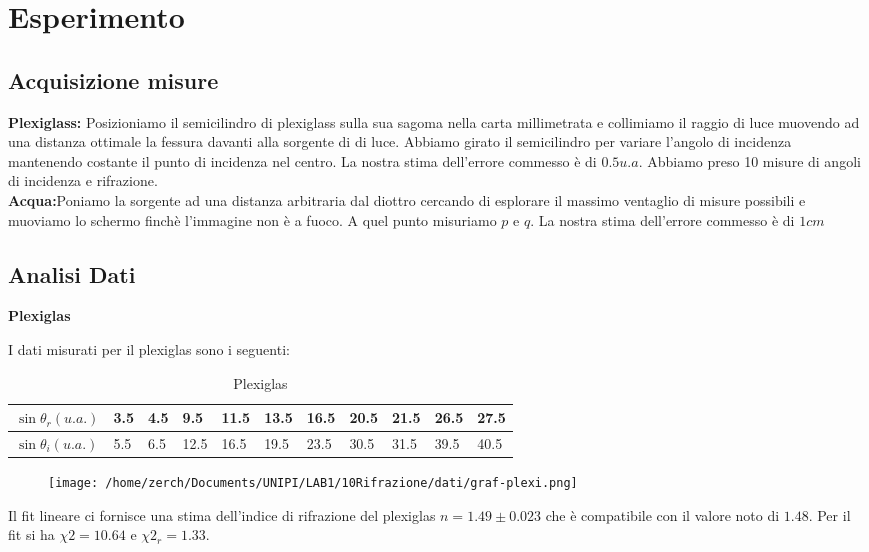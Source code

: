 \documentclass[a4paper,10pt]{article}
\begin{document}
\section{Esperimento}
\subsection{Acquisizione misure}
\textbf{Plexiglass:} Posizioniamo il semicilindro di plexiglass sulla sua sagoma nella carta millimetrata e collimiamo il raggio di luce muovendo ad una distanza ottimale la fessura davanti alla sorgente di di luce. Abbiamo girato il semicilindro per variare l'angolo di incidenza mantenendo costante il punto di incidenza nel centro.
La nostra stima dell'errore commesso è di $0.5 u.a.$
Abbiamo preso 10 misure di angoli di incidenza e rifrazione.
\\ 
\textbf{Acqua:}Poniamo la sorgente ad una distanza arbitraria dal diottro cercando di esplorare il massimo ventaglio di misure possibili e  muoviamo lo schermo finchè l'immagine non è a fuoco.
A quel punto misuriamo $p$ e $q$.
La nostra stima dell'errore commesso è di $1cm$

\subsection{Analisi Dati}
\textbf{Plexiglas}

I dati misurati per il plexiglas sono i seguenti:

\begin{table}[!htb]
\centering
\caption{Plexiglas}
\label{my-labl}
\begin{tabular}{l|llllllllll}
$\sin\theta_r(u.a.)$ & 3.5 & 4.5 & 9.5 & 11.5 & 13.5 & 16.5 & 20.5 & 21.5& 26.5 & 27.5 \\ \hline
$\sin\theta_i(u.a.)$ & 5.5 & 6.5 & 12.5 & 16.5 & 19.5 & 23.5 & 30.5 & 31.5& 39.5 & 40.5
\end{tabular}
\end{table}
\pagebreak

 \begin {figure}[!htb]
\begin{center}
\texttt{[image: /home/zerch/Documents/UNIPI/LAB1/10Rifrazione/dati/graf-plexi.png]}
\end{center}
\end{figure}

Il fit lineare ci fornisce una stima dell'indice di rifrazione del plexiglas $n=1.49\pm0.023$ che è compatibile con il valore noto di $1.48$. Per il fit si ha $\chi2=10.64$ e $\chi2_r=1.33$.
\end{document}
